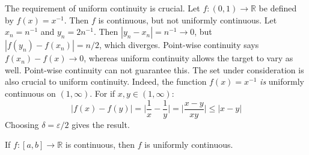 \documentclass[crop=false,class=book,oneside]{standalone}
\begin{document}
            The requirement of uniform continuity is crucial.
            Let $f:(0,1)\rightarrow\mathbb{R}$ be defined by
            $f(x)=x^{-1}$. Then $f$ is continuous, but
            not uniformly continuous. Let $x_{n}=n^{-1}$
            and $y_{n}=2n^{-1}$. Then
            $|y_{n}-x_{n}|=n^{-1}\rightarrow{0}$, but
            $|f(y_{n})-f(x_{n})|=n/2$, which diverges.
            Point-wise continuity says
            $f(x_{n})-f(x)\rightarrow{0}$, whereas
            uniform continuity allows the target to
            vary as well. Point-wise continuity can
            not guarantee this. The set under consideration is
            also crucial to uniform continuity. Indeed,
            the function $f(x)=x^{-1}$ \textit{is} uniformly
            continuous on $(1,\infty)$. For if $x,y\in(1,\infty)$:
            \begin{equation}
                |f(x)-f(y)|=\Big|\frac{1}{x}-\frac{1}{y}\Big|
                =\Big|\frac{x-y}{xy}\Big|\leq|x-y|
            \end{equation}
            Choosing $\delta=\varepsilon/2$ gives the result.
            \begin{theorem}
                \label{thm:FUNCTIONAL_ANALYSIS:CONT_ON_CLOSED_INTERVAL}
                If $f:[a,b]\rightarrow\mathbb{R}$ is continuous,
                then $f$ is uniformly continuous.
            \end{theorem}
\end{document}
